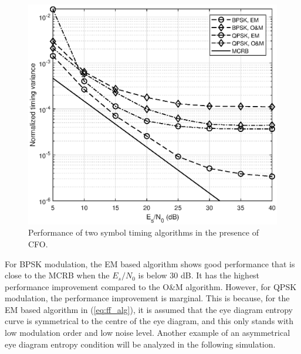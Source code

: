 \documentclass[12pt, draftclsnofoot, onecolumn]{IEEEtran}
\begin{document}
\begin{figure}[ht]
\centering
\includegraphics[width=3 in]{pic/per_timing_frq-k.eps}
\caption{Performance of two symbol timing algorithms in the presence of CFO.}
\label{fig:timing_frq_per} 
\end{figure}  

For BPSK modulation, the EM based algorithm shows good performance that is close to the MCRB when the \(E_s/N_0\) is below 30 dB.
It has the highest performance improvement compared to the O\&M algorithm.
However, for QPSK modulation, the performance improvement is marginal.
This is because, for the EM based algorithm in (\ref{eq:ff_alg}), it is assumed that the eye diagram entropy curve is symmetrical to the centre of the eye diagram, and this only stands with low modulation order and low noise level.
Another example of an asymmetrical eye diagram entropy condition will be analyzed in the following simulation. 
\end{document}
